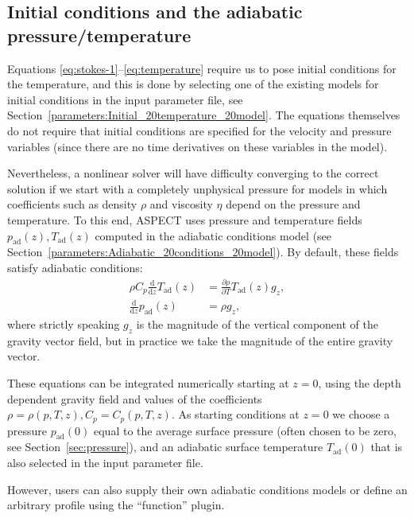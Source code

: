 \documentclass{article}
\newcommand{\aspect}{\textsc{ASPECT}}
\begin{document}
\subsection{Initial conditions and the adiabatic pressure/temperature}
\label{sec:adiabatic}

Equations \eqref{eq:stokes-1}--\eqref{eq:temperature} require us to
pose initial conditions for the temperature, and this is done by
selecting one of the existing models for initial conditions in the
input parameter file, see
Section~\ref{parameters:Initial_20temperature_20model}. The equations
themselves do not require that initial conditions are specified for
the velocity and pressure variables (since there are no time
derivatives on these variables in the model).

Nevertheless, a nonlinear solver will have difficulty converging to
the correct solution if we start with a completely unphysical pressure
for models in which coefficients such as density $\rho$ and viscosity
$\eta$ depend on the pressure and temperature. To this end, \aspect{}
uses pressure and temperature fields $p_{\textrm{ad}}(z),
T_{\textrm{ad}}(z)$ computed in the adiabatic conditions model
(see Section~\ref{parameters:Adiabatic_20conditions_20model}).
By default, these fields satisfy adiabatic conditions:
\begin{align}
  \rho C_p \frac{\textrm{d}}{\textrm{d}z} T_{\textrm{ad}}(z)
  &=
  \frac{\partial\rho}{\partial T} T_{\textrm{ad}}(z) g_z,
\\
  \frac{\textrm{d}}{\textrm{d}z} p_{\textrm{ad}}(z)
  &=
  \rho g_z,
\end{align}
where strictly speaking $g_z$ is the magnitude of the vertical
component of the gravity vector field, but in practice we take the
magnitude of the entire gravity vector.

These equations can be integrated numerically starting at $z=0$, using
the depth dependent gravity field and values of the coefficients
$\rho=\rho(p,T,z), C_p=C_p(p,T,z)$. As starting conditions at $z=0$ we
choose a pressure $p_{\textrm{ad}}(0)$ equal to the average surface
pressure (often chosen to be zero, see Section~\ref{sec:pressure}),
and an adiabatic surface temperature $T_{\textrm{ad}}(0)$ that is
also selected in the input parameter file.

However, users can also supply their own adiabatic conditions models or
define an arbitrary profile using the ``function'' plugin.
\end{document}
